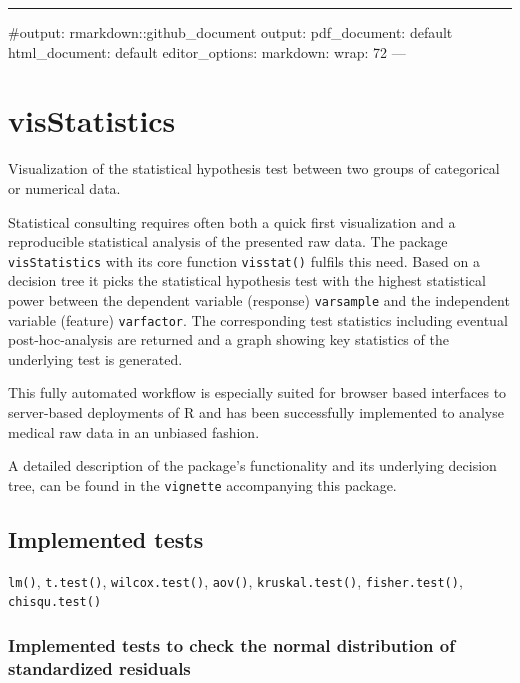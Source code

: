 \documentclass[
]{article}
\author{}
\date{\vspace{-2.5em}}
\begin{document}
\begin{center}\rule{0.5\linewidth}{0.5pt}\end{center}

\#output: rmarkdown::github\_document output: pdf\_document: default
html\_document: default editor\_options: markdown: wrap: 72 ---

\hypertarget{visstatistics}{%
\section{visStatistics}\label{visstatistics}}

Visualization of the statistical hypothesis test between two groups of
categorical or numerical data.

Statistical consulting requires often both a quick first visualization
and a reproducible statistical analysis of the presented raw data. The
package \texttt{visStatistics} with its core function \texttt{visstat()}
fulfils this need. Based on a decision tree it picks the statistical
hypothesis test with the highest statistical power between the dependent
variable (response) \texttt{varsample} and the independent variable
(feature) \texttt{varfactor}. The corresponding test statistics
including eventual post-hoc-analysis are returned and a graph showing
key statistics of the underlying test is generated.

This fully automated workflow is especially suited for browser based
interfaces to server-based deployments of R and has been successfully
implemented to analyse medical raw data in an unbiased fashion.

A detailed description of the package's functionality and its underlying
decision tree, can be found in the \texttt{vignette} accompanying this
package.

\hypertarget{implemented-tests}{%
\subsection{Implemented tests}\label{implemented-tests}}

\texttt{lm()}, \texttt{t.test()}, \texttt{wilcox.test()},
\texttt{aov()}, \texttt{kruskal.test()}, \texttt{fisher.test()},
\texttt{chisqu.test()}

\hypertarget{implemented-tests-to-check-the-normal-distribution-of-standardized-residuals}{%
\subsubsection{Implemented tests to check the normal distribution of
standardized
residuals}\label{implemented-tests-to-check-the-normal-distribution-of-standardized-residuals}}
\end{document}
